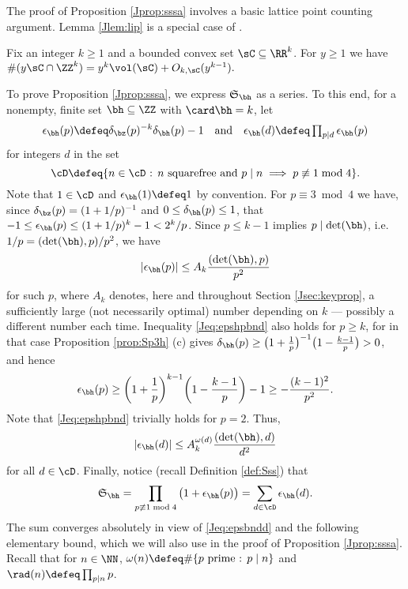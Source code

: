 \documentclass[12pt, reqno, twoside, letterpaper]{amsart}
\begin{document}
\begin{jetsam}
The proof of Proposition \ref{Jprop:sssa} involves a 
basic lattice point counting argument.
%
Lemma \ref{Jlem:lip} is a special case of 
\cite[pp.\ 128--129]{LAN:94}.

\begin{lemma}
 \label{Jlem:lip}
%
Fix an integer $k \ge 1$ and a bounded convex set 
$\sC \subseteq \RR^k$.
%
For $y \ge 1$ we have 
$
 \#(y\sC \cap \ZZ^k)
  =
   y^k\vol(\sC) + O_{k,\sC}(y^{k - 1}).
$
\end{lemma}

To prove Proposition \ref{Jprop:sssa}, we 
express $\mathfrak{S}_{\bh}$ as a series.
%
To this end, for a nonempty, finite set $\bh \subseteq \ZZ$ with 
$\card \bh = k$, let 
\[
 \epsilon_{\bh}(p) 
  \defeq \delta_{\bz}(p)^{-k}\delta_{\bh}(p) - 1
  \quad 
   \text{and}
    \quad 
     \epsilon_{\bh}(d)
      \defeq 
       \textstyle
        \prod_{p \mid d} \epsilon_{\bh}(p)
\]
for integers $d$ in the set
\[ 
  \cD 
   \defeq 
    \{\text{$n \in \cD$ : $n$ squarefree and $p \mid n \implies p \not\equiv 1 \bmod 4$}\}.
\]
%
Note that $1 \in \cD$ and $\epsilon_{\bh}(1) \defeq 1$ by 
convention.
%
For $p \equiv 3 \bmod 4$ we have,
since
$\delta_{\bz}(p) = (1 + 1/p)^{-1}$ and $0 \le \delta_{\bh}(p) \le 1$,  
that $-1 \le \epsilon_{\bh}(p) \le (1 + 1/p)^k - 1 < 2^k/p$.
%
Since $p \le k - 1$ implies $p \mid \det(\bh)$, i.e.\ 
$1/p = (\det(\bh),p)/p^2$, we have 
\begin{equation}
 \label{Jeq:epshpbnd}
  |\epsilon_{\bh}(p)|
   \le 
    A_k\frac{(\det(\bh),p)}{p^2}
\end{equation}
for such $p$, where $A_k$ denotes, here and throughout Section 
\ref{Jsec:keyprop}, a sufficiently large (not necessarily optimal) 
number depending on $k$ --- possibly a different number each time.
%
Inequality \eqref{Jeq:epshpbnd} also holds for $p \ge k$, for in 
that case Proposition \ref{prop:Sp3h} (c) gives
$
 \delta_{\bh}(p) 
  \ge 
   \big(1 + \frac{1}{p}\big)^{-1}
    \big(1 - \frac{k - 1}{p}\big)
     > 
      0
$, 
and hence 
\[
 \epsilon_{\bh}(p)
  \ge 
   \bigg(1 + \frac{1}{p}\bigg)^{k-1}
    \bigg(1 - \frac{k - 1}{p}\bigg)
     -
      1
       \ge 
       -\frac{(k - 1)^2}{p^2}.
\]
%
Note that \eqref{Jeq:epshpbnd} trivially holds for $p = 2$.
%
Thus, 
\begin{equation}
 \label{Jeq:epsbndd}
  |\epsilon_{\bh}(d)|
   \le 
    A_k^{\omega(d)}\frac{(\det(\bh),d)}{d^2}
\end{equation}
for all $d \in \cD$.
%
Finally, notice (recall Definition \ref{def:Sss}) that 
\begin{equation}
 \label{Jeq:defsssS}
 \mathfrak{S}_{\bh}
  =
     \prod_{p \not\equiv 1 \bmod 4}
      \big(1 + \epsilon_{\bh}(p)\big)
  =
      \sum_{d \in \cD}
       \epsilon_{\bh}(d).
\end{equation}
%
The sum converges absolutely in view of \eqref{Jeq:epsbndd} and the 
following elementary bound, which we will also use in the proof 
of Proposition \ref{Jprop:sssa}.
%
Recall that for $n \in \NN$, 
$\omega(n) \defeq \#\{\text{$p$ prime : $p \mid n$}\}$ and  
$\rad(n) \defeq \prod_{p \mid n} p$. 


\end{jetsam}
\end{document}
